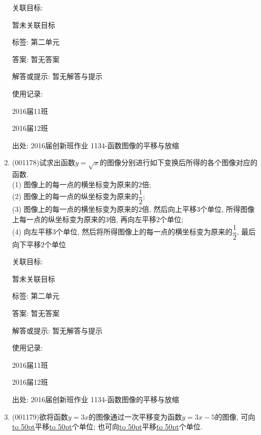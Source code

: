 \documentclass[10pt,a4paper]{article}
\newcommand{\blank}[1]{\underline{\hbox to #1pt{}}}
\begin{document}
\begin{enumerate}[1.]
关联目标:

暂未关联目标



标签: 第二单元

答案: 暂无答案

解答或提示: 暂无解答与提示

使用记录:

2016届11班				

2016届12班				


出处: 2016届创新班作业	1134-函数图像的平移与放缩
\item { (001178)}试求出函数$y=\sqrt{x}$的图像分别进行如下变换后所得的各个图像对应的函数.\\ 
(1) 图像上的每一点的横坐标变为原来的$2$倍;\\ 
(2) 图像上的每一点的纵坐标变为原来的$\dfrac{1}{2}$;\\ 
(3) 图像上的每一点的横坐标变为原来的$2$倍, 然后向上平移$3$个单位, 所得图像上每一点的纵坐标变为原来的$3$倍, 再向左平移$2$个单位;\\ 
(4) 向左平移$3$个单位, 然后将所得图像上的每一点的横坐标变为原来的$\dfrac{1}{2}$, 最后向下平移$2$个单位


关联目标:

暂未关联目标



标签: 第二单元

答案: 暂无答案

解答或提示: 暂无解答与提示

使用记录:

2016届11班				

2016届12班				


出处: 2016届创新班作业	1134-函数图像的平移与放缩
\item { (001179)}欲将函数$y=3x$的图像通过一次平移变为函数$y=3x-5$的图像, 可向\blank{50}平移\blank{50}个单位; 也可向\blank{50}平移\blank{50}个单位.



\end{enumerate}
\end{document}
